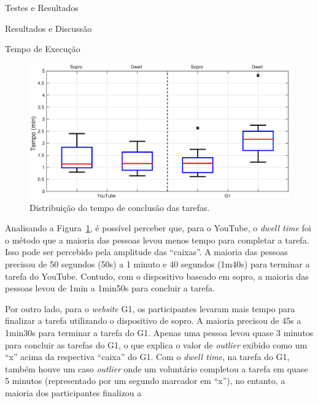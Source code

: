 \begin{chapter}{Testes e Resultados}
\begin{section}{Resultados e Discussão}
\begin{subsection}{Tempo de Execução}
\begin{figure}[!h]
	\centering
	\includegraphics[width=1.0\linewidth]{fig/time}
	\caption{Distribuição do tempo de conclusão das tarefas.}
	\label{fig:tempo}
\end{figure}

Analisando a Figura~\ref{fig:tempo}, é possível perceber que, para o YouTube, o
\textit{dwell time} foi o método que a maioria das pessoas levou menos tempo
para completar a tarefa. Isso pode ser percebido pela amplitude das ``caixas''.
A maioria das pessoas precisou de 50 segundos (50s) a 1 minuto e 40 segundos
(1m40s) para terminar a tarefa do YouTube. Contudo, com o dispositivo baseado em
sopro, a maioria das pessoas levou de 1min a 1min50s para concluir a tarefa.

Por outro lado, para o \textit{website} G1, os participantes levaram mais tempo
para finalizar a tarefa utilizando o dispositivo de sopro. A maioria precisou de
45s a 1min30s para terminar a tarefa do G1. Apenas uma pessoa levou quase 3
minutos para concluir as tarefas do G1, o que explica o valor de
\textit{outlier} exibido como um ``x'' acima da respectiva ``caixa'' do G1. Com
o \textit{dwell time}, na tarefa do G1, também houve um caso \textit{outlier}
onde um voluntário completou a tarefa em quase 5 minutos (representado por um
segundo marcador em ``x''), no entanto, a maioria dos participantes finalizou a


\end{subsection}
\end{section}
\end{chapter}
